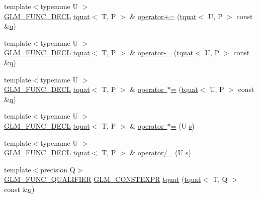 \begin{DoxyCompactItemize}
\item 
{\footnotesize template$<$typename U $>$ }\\\mbox{\hyperlink{setup_8hpp_ab2d052de21a70539923e9bcbf6e83a51}{G\+L\+M\+\_\+\+F\+U\+N\+C\+\_\+\+D\+E\+CL}} \mbox{\hyperlink{structglm_1_1tquat}{tquat}}$<$ T, P $>$ \& \mbox{\hyperlink{structglm_1_1tquat_a6a659798636ad7f9d8cb392904b61020}{operator+=}} (\mbox{\hyperlink{structglm_1_1tquat}{tquat}}$<$ U, P $>$ const \&\mbox{\hyperlink{glad_8h_a514729309336df22bcc8eda979d6ced4}{q}})
\item 
{\footnotesize template$<$typename U $>$ }\\\mbox{\hyperlink{setup_8hpp_ab2d052de21a70539923e9bcbf6e83a51}{G\+L\+M\+\_\+\+F\+U\+N\+C\+\_\+\+D\+E\+CL}} \mbox{\hyperlink{structglm_1_1tquat}{tquat}}$<$ T, P $>$ \& \mbox{\hyperlink{structglm_1_1tquat_aae515aeb43cddd4074a27a74aa516475}{operator-\/=}} (\mbox{\hyperlink{structglm_1_1tquat}{tquat}}$<$ U, P $>$ const \&\mbox{\hyperlink{glad_8h_a514729309336df22bcc8eda979d6ced4}{q}})
\item 
{\footnotesize template$<$typename U $>$ }\\\mbox{\hyperlink{setup_8hpp_ab2d052de21a70539923e9bcbf6e83a51}{G\+L\+M\+\_\+\+F\+U\+N\+C\+\_\+\+D\+E\+CL}} \mbox{\hyperlink{structglm_1_1tquat}{tquat}}$<$ T, P $>$ \& \mbox{\hyperlink{structglm_1_1tquat_ab20750f12f61be8ace6a98403fab1251}{operator $\ast$=}} (\mbox{\hyperlink{structglm_1_1tquat}{tquat}}$<$ U, P $>$ const \&\mbox{\hyperlink{glad_8h_a514729309336df22bcc8eda979d6ced4}{q}})
\item 
{\footnotesize template$<$typename U $>$ }\\\mbox{\hyperlink{setup_8hpp_ab2d052de21a70539923e9bcbf6e83a51}{G\+L\+M\+\_\+\+F\+U\+N\+C\+\_\+\+D\+E\+CL}} \mbox{\hyperlink{structglm_1_1tquat}{tquat}}$<$ T, P $>$ \& \mbox{\hyperlink{structglm_1_1tquat_a8a3b8ad190cb91845595bd8b11a64b78}{operator $\ast$=}} (U \mbox{\hyperlink{glad_8h_af1b1d5edfea6a34daee7389b1b5810ad}{s}})
\item 
{\footnotesize template$<$typename U $>$ }\\\mbox{\hyperlink{setup_8hpp_ab2d052de21a70539923e9bcbf6e83a51}{G\+L\+M\+\_\+\+F\+U\+N\+C\+\_\+\+D\+E\+CL}} \mbox{\hyperlink{structglm_1_1tquat}{tquat}}$<$ T, P $>$ \& \mbox{\hyperlink{structglm_1_1tquat_ab9348510c32247974addf29b37304b2b}{operator/=}} (U \mbox{\hyperlink{glad_8h_af1b1d5edfea6a34daee7389b1b5810ad}{s}})
\item 
{\footnotesize template$<$precision Q$>$ }\\\mbox{\hyperlink{setup_8hpp_a33fdea6f91c5f834105f7415e2a64407}{G\+L\+M\+\_\+\+F\+U\+N\+C\+\_\+\+Q\+U\+A\+L\+I\+F\+I\+ER}} \mbox{\hyperlink{setup_8hpp_a08b807947b47031d3a511f03f89645ad}{G\+L\+M\+\_\+\+C\+O\+N\+S\+T\+E\+X\+PR}} \mbox{\hyperlink{structglm_1_1tquat_ac5c48665db8dff83698487153ee5b1fc}{tquat}} (\mbox{\hyperlink{structglm_1_1tquat}{tquat}}$<$ T, Q $>$ const \&\mbox{\hyperlink{glad_8h_a514729309336df22bcc8eda979d6ced4}{q}})

\end{DoxyCompactItemize}
